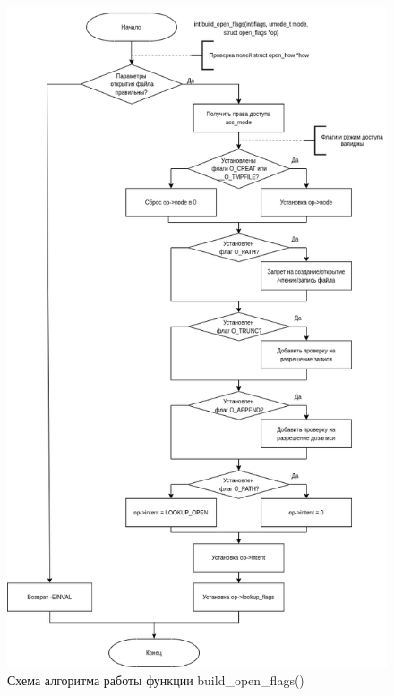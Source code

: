 \begin{figure}[H]
	\centering
	\includegraphics[scale=0.5]{assets/open-build_open_flags.drawio.png}
	\caption{Схема алгоритма работы функции build\_open\_flags()}
\end{figure}

